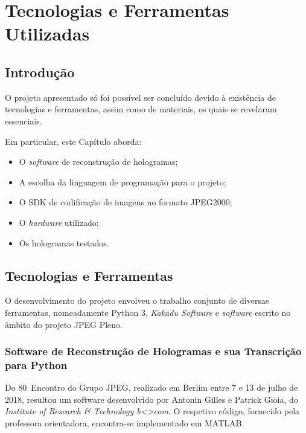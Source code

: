 \chapter{Tecnologias e Ferramentas Utilizadas}
\label{chap:tecno-ferra}

\section{Introdução}
\label{chap3:sec:intro}

O projeto apresentado só foi possível ser concluído devido à existência de tecnologias e ferramentas, assim como de materiais, os quais se revelaram essenciais.

Em particular, este Capítulo aborda:

\begin{itemize}
    \item O \textit{software} de reconstrução de hologramas;
    \item A escolha da linguagem de programação para o projeto;
    \item O \ac{SDK} de codificação de imagens no formato JPEG2000;
    \item O \textit{hardware} utilizado;
    \item Os hologramas testados.
\end{itemize}



\section{Tecnologias e Ferramentas}
\label{chap3:sec:tec-ferr}

O desenvolvimento do projeto envolveu o trabalho conjunto de diversas ferramentas, nomeadamente Python 3, \textit{Kakadu Software} e \textit{software} escrito no âmbito do projeto JPEG Pleno.

\subsection{Software de Reconstrução de Hologramas e sua Transcrição para Python}

Do 80\textordmasculine~Encontro do Grupo JPEG, realizado em Berlim entre 7 e 13 de julho de 2018, resultou um software desenvolvido por Antonin Gilles e Patrick Gioia, do \textit{Institute of Research \& Technology b<>com}. O respetivo código, fornecido pela professora orientadora, encontra-se implementado em MATLAB.

